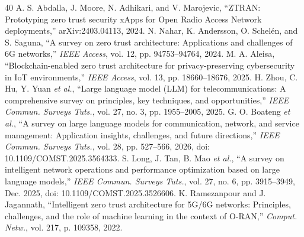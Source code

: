 \documentclass[journal]{IEEEtran}
\newif\ifshowrevisions
\newcommand{\rev}[1]{{\ifshowrevisions\color{blue}\else\color{black}\fi #1}}
\begin{document}
\begin{thebibliography}{40}
A. S. Abdalla, J. Moore, N. Adhikari, and V. Marojevic, ``ZTRAN: Prototyping
zero trust security xApps for Open Radio Access Network deployments,''
arXiv:2403.04113, 2024.
N. Nahar, K. Andersson, O. Schel{\'e}n, and S. Saguna, ``A survey on zero
trust architecture: Applications and challenges of 6G networks,'' \emph{IEEE
Access}, vol. 12, pp. 94753--94764, 2024.
M. A. Aleisa, ``Blockchain-enabled zero trust architecture for
privacy-preserving cybersecurity in IoT environments,'' \emph{IEEE Access},
vol. 13, pp. 18660--18676, 2025.
H. Zhou, C. Hu, Y. Yuan \emph{et al.}, ``Large language model (LLM) for
telecommunications: A comprehensive survey on principles, key techniques, and
opportunities,'' \emph{IEEE Commun. Surveys Tuts.}, vol. 27, no. 3,
pp. 1955--2005, 2025.
G. O. Boateng \emph{et al.}, ``A survey on large
language models for communication, network, and service management:
Application insights, challenges, and future directions,'' \emph{IEEE Commun.
Surveys Tuts.}, \rev{vol. 28, pp. 527--566, 2026, doi: 10.1109/COMST.2025.3564333.}
S. Long, J. Tan, B. Mao \emph{et al.}, ``A survey on intelligent network
operations and performance optimization based on large language models,''
\emph{IEEE Commun. Surveys Tuts.}, \rev{vol. 27, no. 6,
pp. 3915--3949, Dec. 2025}, doi: 10.1109/COMST.2025.3526606.
K. Ramezanpour and J. Jagannath, ``Intelligent zero trust architecture for
5G/6G networks: Principles, challenges, and the role of machine learning in
the context of O-RAN,'' \emph{Comput. Netw.}, vol. 217, p. 109358, 2022.


\end{thebibliography}
\end{document}
